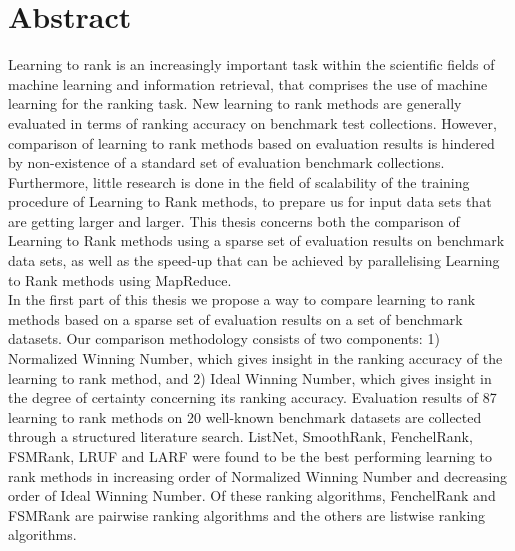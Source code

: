 \begingroup
\let\clearpage\relax
\let\cleardoublepage\relax
\let\cleardoublepage\relax

\chapter*{Abstract}
Learning to rank is an increasingly important task within the scientific fields of machine learning and information retrieval, that comprises the use of machine learning for the ranking task. New learning to rank methods are generally evaluated in terms of ranking accuracy on benchmark test collections. However, comparison of learning to rank methods based on evaluation results is hindered by non-existence of a standard set of evaluation benchmark collections. Furthermore, little research is done in the field of scalability of the training procedure of Learning to Rank methods, to prepare us for input data sets that are getting larger and larger. This thesis concerns both the comparison of Learning to Rank methods using a sparse set of evaluation results on benchmark data sets, as well as the speed-up that can be achieved by parallelising Learning to Rank methods using MapReduce.\\

In the first part of this thesis we propose a way to compare learning to rank methods based on a sparse set of evaluation results on a set of benchmark datasets. Our comparison methodology consists of two components: 1) Normalized Winning Number, which gives insight in the ranking accuracy of the learning to rank method, and 2) Ideal Winning Number, which gives insight in the degree of certainty concerning its ranking accuracy. Evaluation results of 87 learning to rank methods on 20 well-known benchmark datasets are collected through a structured literature search. ListNet, SmoothRank, FenchelRank, FSMRank, LRUF and LARF were found to be the best performing learning to rank methods in increasing order of Normalized Winning Number and decreasing order of Ideal Winning Number. Of these ranking algorithms, FenchelRank and FSMRank are pairwise ranking algorithms and the others are listwise ranking algorithms.\\

